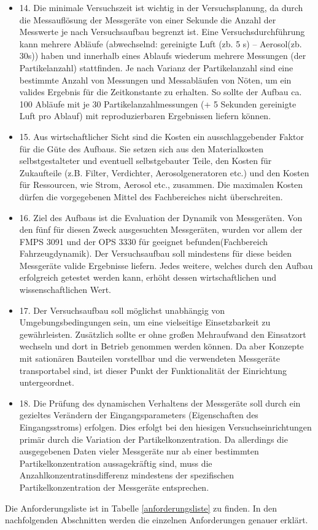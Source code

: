 \begin{itemize}
\item 14. Die minimale Versuchszeit ist wichtig in der Versuchsplanung, da durch die Messaufl\"{o}sung der Messger\"{a}te von einer Sekunde die Anzahl der Messwerte je nach Versuchsaufbau begrenzt ist. Eine Versuchsdurchf\"{u}hrung kann mehrere Abl\"{a}ufe (abwechselnd: gereinigte Luft (zb. 5 s) -- Aerosol(zb. 30s)) haben und innerhalb eines Ablaufs wiederum mehrere Messungen (der Partikelanzahl) stattfinden. Je nach Varianz der Partikelanzahl sind eine bestimmte Anzahl von Messungen und Messabl\"{a}ufen von N\"{o}ten, um ein valides Ergebnis für die Zeitkonstante zu erhalten. So sollte der Aufbau ca. 100 Abl\"{a}ufe mit je 30 Partikelanzahlmessungen (+ 5 Sekunden gereinigte Luft pro Ablauf) mit reproduzierbaren Ergebnissen liefern k\"{o}nnen.

\item 15. Aus wirtschaftlicher Sicht sind die Kosten ein ausschlaggebender Faktor für die G\"{u}te des Aufbaus. Sie setzen sich aus den Materialkosten selbstgestalteter und eventuell selbstgebauter Teile, den Kosten für Zukaufteile (z.B. Filter, Verdichter, Aerosolgeneratoren etc.) und den Kosten f\"{u}r Ressourcen, wie Strom, Aerosol etc., zusammen. Die maximalen Kosten d\"{u}rfen die vorgegebenen Mittel des Fachbereiches nicht \"{u}berschreiten.

\item 16. Ziel des Aufbaus ist die Evaluation der Dynamik von Messger\"{a}ten. Von den f\"{u}nf f\"{u}r diesen Zweck ausgesuchten Messger\"{a}ten, wurden vor allem der FMPS 3091 und der OPS 3330 f\"{u}r geeignet befunden(Fachbereich Fahrzeugdynamik).
Der Versuchsaufbau soll mindestens f\"{u}r diese beiden Messger\"{a}te valide Ergebnisse liefern. Jedes weitere, welches durch den Aufbau erfolgreich getestet werden kann, erh\"{o}ht dessen wirtschaftlichen und wissenschaftlichen Wert. 

\item 17. Der Versuchsaufbau soll m\"{o}glichst unabh\"{a}ngig von Umgebungsbedingungen sein, um eine vielseitige Einsetzbarkeit zu gew\"{a}hrleisten. Zus\"{a}tzlich sollte er ohne gro{\ss}en Mehraufwand den Einsatzort wechseln und dort in Betrieb genommen werden k\"{o}nnen. Da aber Konzepte mit sation\"{a}ren Bauteilen vorstellbar und die verwendeten Messger\"{a}te transportabel sind, ist dieser Punkt der Funktionalit\"{a}t der Einrichtung untergeordnet.

\item 18. Die Pr\"{u}fung des dynamischen Verhaltens der Messger\"{a}te soll durch ein gezieltes Ver\"{a}ndern der Eingangsparameters (Eigenschaften des Eingangsstroms) erfolgen. Dies erfolgt bei den hiesigen Versuchseinrichtungen prim\"{a}r durch die Variation der Partikelkonzentration. Da allerdings die ausgegebenen Daten vieler Messger\"{a}te nur ab einer bestimmten Partikelkonzentration aussagekr\"{a}ftig sind, muss die Anzahlkonzentratinsdifferenz mindestens der spezifischen Partikelkonzentration der Messger\"{a}te entsprechen. 
\end{itemize}
Die Anforderungsliste ist in Tabelle \ref{anforderungsliste} zu finden. In den nachfolgenden Abschnitten werden die einzelnen Anforderungen genauer erkl\"{a}rt.


